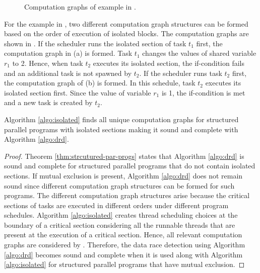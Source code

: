 \begin{figure}
  \caption{Computation graphs of example in .}
   \label{fig:cg-isolated}
\end{figure}

For the example in , two different computation graph structures can be formed based on the order of execution of isolated blocks. The computation graphs are shown in . If the scheduler runs the isolated section of task $t_1$ first, the computation graph in (a) is formed. Task $t_1$ changes the values of shared variable $r_1$ to 2. Hence, when task $t_2$ executes its isolated section, the if-condition fails and an additional task is not spawned by $t_2$. If the scheduler runs task $t_2$ first, the computation graph of (b) is formed. In this schedule, task $t_2$ executes its isolated section first. Since the value of variable $r_1$ is 1, the if-condition is met and a new task is created by $t_2$.

\begin{theorem}
Algorithm \ref{algo:isolated} finds all unique computation graphs for structured parallel programs with isolated sections making it sound and complete with Algorithm \ref{algo:drd}.
\end{theorem}

\begin{proof}
Theorem \ref{thm:strcutured-par-progs} states that Algorithm \ref{algo:drd} is sound and complete for structured parallel programs that do not contain isolated sections. If mutual exclusion is present, Algorithm \ref{algo:drd} does not remain sound since different computation graph structures can be formed for such programs. The different computation graph structures arise because the critical sections of tasks are executed in different orders under different program schedules. Algorithm \ref{algo:isolated} creates thread scheduling choices at the boundary of a critical section considering all the runnable threads that are present at the execution of a critical section. Hence, all relevant computation graphs are considered by . Therefore, the data race detection using Algorithm \ref{algo:drd} becomes sound and complete when it is used along with Algorithm \ref{algo:isolated} for structured parallel programs that have mutual exclusion.
\end{proof}
